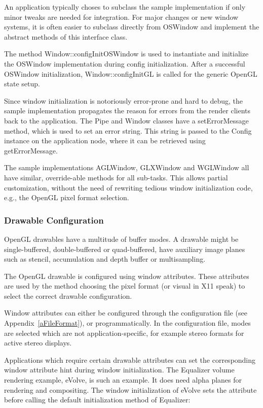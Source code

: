 \documentclass[10pt,a4]{scrartcl}
\newcommand{\aref}[1]{Appendix~\ref{#1}}
\begin{document}
An application typically choses to subclass the sample implementation if
only minor tweaks are needed for integration. For major changes or new
window systems, it is often easier to subclass directly from
\textsf{OSWindow} and implement the abstract methods of this interface
class.

The method \textsf{Window::configInitOSWindow} is used to instantiate
and initialize the \textsf{OSWindow} implementation during config
initialization. After a successful \textsf{OSWindow} initialization,
\textsf{Window::configInitGL} is called for the generic OpenGL state
setup.

Since window initialization is notoriously error-prone and hard to
debug, the sample implementation propagates the reason for errors
from the render clients back to the application. The \textsf{Pipe} and
\textsf{Window} classes have a \textsf{setErrorMessage} method, which is
used to set an error string. This string is passed to the
\textsf{Config} instance on the application node, where it can be
retrieved using \textsf{getErrorMessage}.

The sample implementations \textsf{AGLWindow}, \textsf{GLXWindow} and
\textsf{WGLWindow} all have similar, override-able methods for all
sub-tasks. This allows partial customization, without the need of
rewriting tedious window initialization code, e.g., the OpenGL pixel
format selection.

\subsubsection{\label{sDrawableConfig}Drawable Configuration}

OpenGL drawables have a multitude of buffer modes. A drawable might be
single-buffered, double-buffered or quad-buffered, have auxiliary image
planes such as stencil, accumulation and depth buffer or multisampling.

The OpenGL drawable is configured using window attributes. These
attributes are used by the method choosing the pixel format (or visual
in X11 speak) to select the correct drawable configuration.

Window attributes can either be configured through the configuration
file (see \aref{aFileFormat}), or programmatically. In the configuration
file, modes are selected which are not application-specific, for example
stereo formats for active stereo displays. 

Applications which require certain drawable attributes can set the
corresponding window attribute hint during window initialization. The
Equalizer volume rendering example, \textsf{eVolve}, is such an
example. It does need alpha planes for rendering and compositing. The
window initialization of \textsf{eVolve} sets the attribute before
calling the default initialization method of Equalizer:
\end{document}
